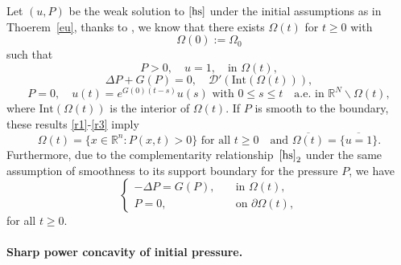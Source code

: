 \documentclass[10pt]{article}         %
\numberwithin{equation}{section}
\begin{document}
Let $(u,P)$ be the weak solution to $\eqref{hs}$ under the initial assumptions as in Thoerem~\ref{eu}, thanks to \cite[Theorem 1.1]{DN2023}, we know that  there exists $\Omega(t)$ for  $t\geq0$ with 
\[\Omega(0):=\Omega_0\]
such that  
    \begin{equation}\label{r1}
    P>0,\quad u=1,\quad \text{in }\Omega(t),
    \end{equation}
    \begin{equation}\label{r2}
        \Delta P+G(P)=0,\quad \mathcal{D}'(\text{Int}(\Omega(t))),
    \end{equation}
    \begin{equation}\label{r3}
  P=0,\quad u(t)=e^{G(0)(t-s)}u(s)\text{ with }0\leq s\leq t\quad\text{a.e. in }\mathbb{R}^N\backslash \Omega(t),      
    \end{equation}
where $\text{Int}(\Omega(t))$ is the interior of $\Omega(t)$. If $P$ is smooth to the boundary, these results \eqref{r1}-\eqref{r3} imply  \begin{equation*}
 \Omega(t)=\{x\in\mathbb{R}^n: P(x,t)>0\}\text{ for all }t\geq0\quad \text{and } \overline{\Omega(t)}=\overline{\{u=1\}}.
\end{equation*}
Furthermore, due to the complementarity relationship~$\eqref{hs}_2$ under the same assumption of smoothness to its support boundary for the pressure $P$, we have
\begin{equation}\label{hss}
\begin{cases}
-\Delta P=G(P),\quad &\text{in }\Omega(t),\\
P=0,\quad&\text{on }\partial\Omega(t),
\end{cases}
\end{equation}
for all $t\geq 0$. 



\paragraph{Sharp power concavity of initial pressure.} 



\vspace{2mm}
\end{document}
